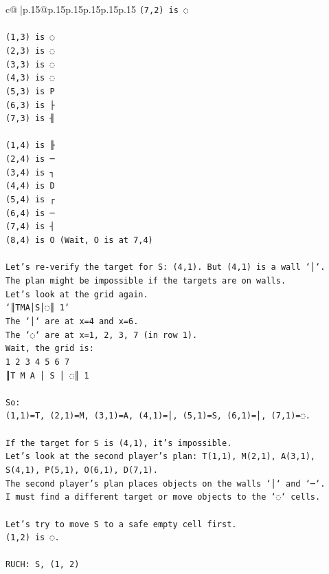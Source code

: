 \documentclass{article}
\begin{document}
{\begin{supertabular}{c@{$\;$}|p{.15\linewidth}@{}p{.15\linewidth}p{.15\linewidth}p{.15\linewidth}p{.15\linewidth}p{.15\linewidth}}
{{{\texttt{(7,2) is ◌} \\
\\ 
\texttt{(1,3) is ◌} \\
\texttt{(2,3) is ◌} \\
\texttt{(3,3) is ◌} \\
\texttt{(4,3) is ◌} \\
\texttt{(5,3) is P} \\
\texttt{(6,3) is ├} \\
\texttt{(7,3) is ╢} \\
\\ 
\texttt{(1,4) is ╟} \\
\texttt{(2,4) is ─} \\
\texttt{(3,4) is ┐} \\
\texttt{(4,4) is D} \\
\texttt{(5,4) is ┌} \\
\texttt{(6,4) is ─} \\
\texttt{(7,4) is ┤} \\
\texttt{(8,4) is O (Wait, O is at 7,4)} \\
\\ 
\texttt{Let's re{-}verify the target for S: (4,1). But (4,1) is a wall `│`.} \\
\texttt{The plan might be impossible if the targets are on walls.} \\
\texttt{Let's look at the grid again.} \\
\texttt{`║TMA│S│◌║ 1`} \\
\texttt{The `│` are at x=4 and x=6.} \\
\texttt{The `◌` are at x=1, 2, 3, 7 (in row 1).} \\
\texttt{Wait, the grid is:} \\
\texttt{1 2 3 4 5 6 7} \\
\texttt{║T M A │ S │ ◌║ 1} \\
\\ 
\texttt{So:} \\
\texttt{(1,1)=T, (2,1)=M, (3,1)=A, (4,1)=│, (5,1)=S, (6,1)=│, (7,1)=◌.} \\
\\ 
\texttt{If the target for S is (4,1), it's impossible.} \\
\texttt{Let's look at the second player's plan: T(1,1), M(2,1), A(3,1), S(4,1), P(5,1), O(6,1), D(7,1).} \\
\texttt{The second player's plan places objects on the walls `│` and `─`.} \\
\texttt{I must find a different target or move objects to the `◌` cells.} \\
\\ 
\texttt{Let's try to move S to a safe empty cell first.} \\
\texttt{(1,2) is ◌.} \\
\\ 
\texttt{RUCH: S, (1, 2)} \\
            }
        }
    }
     \\ \\


\end{supertabular}}
\end{document}

